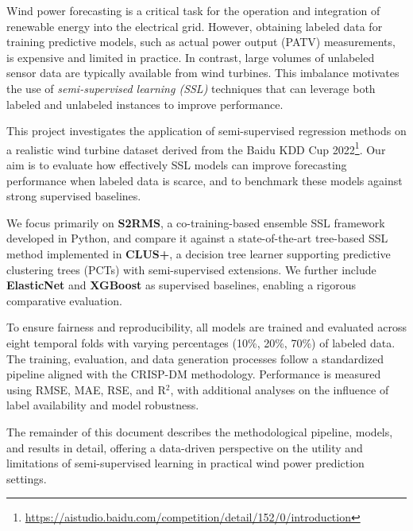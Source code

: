 Wind power forecasting is a critical task for the operation and integration of renewable energy into the electrical grid. However, obtaining labeled data for training predictive models, such as actual power output (PATV) measurements, is expensive and limited in practice. In contrast, large volumes of unlabeled sensor data are typically available from wind turbines. This imbalance motivates the use of \textit{semi-supervised learning (SSL)} techniques that can leverage both labeled and unlabeled instances to improve performance.

This project investigates the application of semi-supervised regression methods on a realistic wind turbine dataset derived from the Baidu KDD Cup 2022\footnote{\href{https://aistudio.baidu.com/competition/detail/152/0/introduction}{https://aistudio.baidu.com/competition/detail/152/0/introduction}}. Our aim is to evaluate how effectively SSL models can improve forecasting performance when labeled data is scarce, and to benchmark these models against strong supervised baselines.

We focus primarily on \textbf{S2RMS}, a co-training-based ensemble SSL framework developed in Python, and compare it against a state-of-the-art tree-based SSL method implemented in \textbf{CLUS+}, a decision tree learner supporting predictive clustering trees (PCTs) with semi-supervised extensions. We further include \textbf{ElasticNet} and \textbf{XGBoost} as supervised baselines, enabling a rigorous comparative evaluation.

To ensure fairness and reproducibility, all models are trained and evaluated across eight temporal folds with varying percentages (10\%, 20\%, 70\%) of labeled data. The training, evaluation, and data generation processes follow a standardized pipeline aligned with the CRISP-DM methodology. Performance is measured using RMSE, MAE, RSE, and R$^2$, with additional analyses on the influence of label availability and model robustness.

The remainder of this document describes the methodological pipeline, models, and results in detail, offering a data-driven perspective on the utility and limitations of semi-supervised learning in practical wind power prediction settings.

